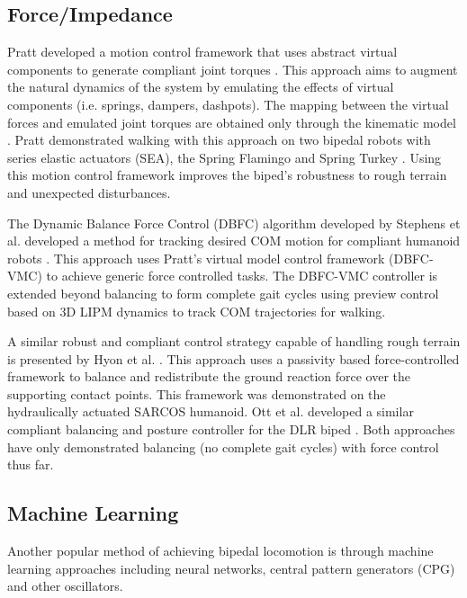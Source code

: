 \subsection{Force/Impedance} %
\label{sub:related_force_impedance}
Pratt developed a motion control framework that uses abstract virtual components to generate compliant joint torques \cite{Pratt:1995ww}. This approach aims to augment the natural dynamics of the system by emulating the effects of virtual components (i.e. springs, dampers, dashpots). The mapping between the virtual forces and emulated joint torques are obtained only through the kinematic model \cite{Pratt:1998cf}. Pratt demonstrated walking with this approach on two bipedal robots with series elastic actuators (SEA), the Spring Flamingo and Spring Turkey \cite{Pratt:2001vu}. Using this motion control framework improves the biped's robustness to rough terrain and unexpected disturbances.

The Dynamic Balance Force Control (DBFC) algorithm developed by Stephens et al. developed a method for tracking desired COM motion for compliant humanoid robots \cite{Stephens:2010fj}. This approach uses Pratt's virtual model control framework (DBFC-VMC) to achieve generic force controlled tasks. The DBFC-VMC controller is extended beyond balancing to form complete gait cycles using preview control \cite{KajitaEtAlICRA2003} based on 3D LIPM dynamics to track COM trajectories for walking. 

A similar robust and compliant control strategy capable of handling rough terrain is presented by Hyon et al. \cite{Hyon2007}. This approach uses a passivity based force-controlled framework to balance and redistribute the ground reaction force over the supporting contact points. This framework was demonstrated on the hydraulically actuated SARCOS humanoid. Ott et al. developed a similar compliant balancing and posture controller for the DLR biped \cite{Ott:2010jz}. Both approaches have only demonstrated balancing (no complete gait cycles) with force control thus far. 



\subsection{Machine Learning} %
\label{sub:related_machine_learning}
Another popular method of achieving bipedal locomotion is through machine learning approaches including neural networks, central pattern generators (CPG) and other oscillators. 

